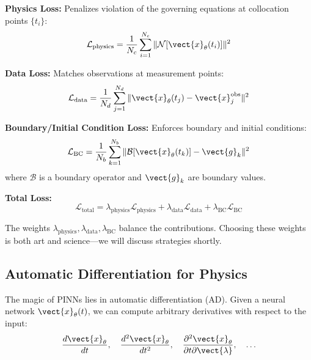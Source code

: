 \textbf{Physics Loss:} Penalizes violation of the governing equations at collocation points $\{t_i\}$:
\begin{equation}
\mathcal{L}_{\text{physics}} = \frac{1}{N_c} \sum_{i=1}^{N_c} \|\mathcal{N}[\vect{x}_\theta(t_i)]\|^2
\label{eq:physics_loss}
\end{equation}

\textbf{Data Loss:} Matches observations at measurement points:
\begin{equation}
\mathcal{L}_{\text{data}} = \frac{1}{N_d} \sum_{j=1}^{N_d} \|\vect{x}_\theta(t_j) - \vect{x}_j^{\text{obs}}\|^2
\label{eq:data_loss}
\end{equation}

\textbf{Boundary/Initial Condition Loss:} Enforces boundary and initial conditions:
\begin{equation}
\mathcal{L}_{\text{BC}} = \frac{1}{N_b} \sum_{k=1}^{N_b} \|\mathcal{B}[\vect{x}_\theta(t_k)] - \vect{g}_k\|^2
\label{eq:bc_loss}
\end{equation}
where $\mathcal{B}$ is a boundary operator and $\vect{g}_k$ are boundary values.

\textbf{Total Loss:}
\begin{equation}
\mathcal{L}_{\text{total}} = \lambda_{\text{physics}} \mathcal{L}_{\text{physics}} + \lambda_{\text{data}} \mathcal{L}_{\text{data}} + \lambda_{\text{BC}} \mathcal{L}_{\text{BC}}
\label{eq:total_pinn_loss}
\end{equation}

The weights $\lambda_{\text{physics}}, \lambda_{\text{data}}, \lambda_{\text{BC}}$ balance the contributions. Choosing these weights is both art and science---we will discuss strategies shortly.


\subsection{Automatic Differentiation for Physics}

The magic of PINNs lies in automatic differentiation (AD). Given a neural network $\vect{x}_\theta(t)$, we can compute arbitrary derivatives with respect to the input:
\begin{equation}
\frac{d\vect{x}_\theta}{dt}, \quad \frac{d^2\vect{x}_\theta}{dt^2}, \quad \frac{\partial^2 \vect{x}_\theta}{\partial t \partial \vect{\lambda}}, \quad \ldots
\end{equation}

